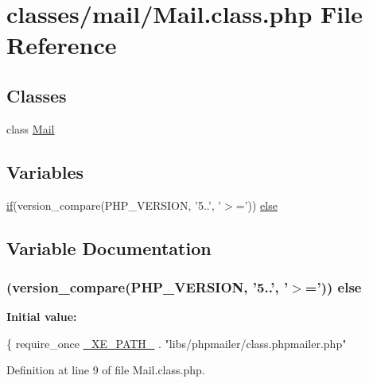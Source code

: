 \hypertarget{Mail_8class_8php}{\section{classes/mail/\+Mail.class.\+php File Reference}
\label{Mail_8class_8php}
}
\subsection*{Classes}
\begin{DoxyCompactItemize}
\item 
class \hyperlink{classMail}{Mail}
\end{DoxyCompactItemize}
\subsection*{Variables}
\begin{DoxyCompactItemize}
\item 
\hyperlink{point__level__icon_8addon_8php_a29031816e50a8f742422e671b2bef9b2}{if}(version\+\_\+compare(P\+H\+P\+\_\+\+V\+E\+R\+S\+I\+O\+N, '5..', '$>$=')) \hyperlink{Mail_8class_8php_ab13fcd53787fc51418153752d5962cda}{else}
\end{DoxyCompactItemize}


\subsection{Variable Documentation}
\hypertarget{Mail_8class_8php_ab13fcd53787fc51418153752d5962cda}{
\subsubsection[{else}]{ (version\+\_\+compare(P\+H\+P\+\_\+\+V\+E\+R\+S\+I\+O\+N, '5..', '$>$=')) else}}\label{Mail_8class_8php_ab13fcd53787fc51418153752d5962cda}
{\bfseries Initial value\+:}
\begin{DoxyCode}
\{
    require\_once \hyperlink{config_8inc_8php_a5387c7a3f2aa38adf16f324cee88db88}{\_XE\_PATH\_} . \textcolor{stringliteral}{"libs/phpmailer/class.phpmailer.php"}
\end{DoxyCode}


Definition at line 9 of file Mail.\+class.\+php.

